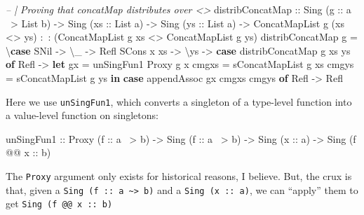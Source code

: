 \documentclass[]{article}
\newenvironment{Shaded}{}{}
\newcommand{\CommentTok}[1]{\textcolor[rgb]{0.38,0.63,0.69}{\textit{#1}}}
\newcommand{\DataTypeTok}[1]{\textcolor[rgb]{0.56,0.13,0.00}{#1}}
\newcommand{\FunctionTok}[1]{\textcolor[rgb]{0.02,0.16,0.49}{#1}}
\newcommand{\KeywordTok}[1]{\textcolor[rgb]{0.00,0.44,0.13}{\textbf{#1}}}
\newcommand{\NormalTok}[1]{#1}
\newcommand{\OtherTok}[1]{\textcolor[rgb]{0.00,0.44,0.13}{#1}}
\begin{document}
\begin{Shaded}
\begin{Highlighting}[]
\CommentTok{-- | Proving that concatMap distributes over <>}
\NormalTok{distribConcatMap}
\OtherTok{    ::} \DataTypeTok{Sing}\NormalTok{ (}\OtherTok{g ::}\NormalTok{ a }\FunctionTok{~>} \DataTypeTok{List}\NormalTok{ b)}
    \OtherTok{->} \DataTypeTok{Sing}\NormalTok{ (}\OtherTok{xs ::} \DataTypeTok{List}\NormalTok{ a)}
    \OtherTok{->} \DataTypeTok{Sing}\NormalTok{ (}\OtherTok{ys ::} \DataTypeTok{List}\NormalTok{ a)}
    \OtherTok{->} \DataTypeTok{ConcatMapList}\NormalTok{ g (xs }\FunctionTok{<>}\NormalTok{ ys) }\FunctionTok{:~:}\NormalTok{ (}\DataTypeTok{ConcatMapList}\NormalTok{ g xs }\FunctionTok{<>} \DataTypeTok{ConcatMapList}\NormalTok{ g ys)}
\NormalTok{distribConcatMap g }\FunctionTok{=}\NormalTok{ \textbackslash{}}\KeywordTok{case}
    \DataTypeTok{SNil} \OtherTok{->}\NormalTok{ \textbackslash{}_ }\OtherTok{->} \DataTypeTok{Refl}
    \DataTypeTok{SCons}\NormalTok{ x xs }\OtherTok{->}\NormalTok{ \textbackslash{}ys }\OtherTok{->}
      \KeywordTok{case}\NormalTok{ distribConcatMap g xs ys }\KeywordTok{of}
        \DataTypeTok{Refl} \OtherTok{->}
          \KeywordTok{let}\NormalTok{ gx    }\FunctionTok{=}\NormalTok{ unSingFun1 }\DataTypeTok{Proxy}\NormalTok{ g x}
\NormalTok{              cmgxs }\FunctionTok{=}\NormalTok{ sConcatMapList g xs}
\NormalTok{              cmgys }\FunctionTok{=}\NormalTok{ sConcatMapList g ys}
          \KeywordTok{in}  \KeywordTok{case}\NormalTok{ appendAssoc gx cmgxs cmgys }\KeywordTok{of}
                \DataTypeTok{Refl} \OtherTok{->} \DataTypeTok{Refl}
\end{Highlighting}
\end{Shaded}

Here we use \texttt{unSingFun1}, which converts a singleton of a type-level
function into a value-level function on singletons:

\begin{Shaded}
\begin{Highlighting}[]
\NormalTok{unSingFun1}
\OtherTok{    ::} \DataTypeTok{Proxy}\NormalTok{ (}\OtherTok{f      ::}\NormalTok{ a }\FunctionTok{~>}\NormalTok{ b)}
    \OtherTok{->} \DataTypeTok{Sing}\NormalTok{  (}\OtherTok{f      ::}\NormalTok{ a }\FunctionTok{~>}\NormalTok{ b)}
    \OtherTok{->} \DataTypeTok{Sing}\NormalTok{  (}\OtherTok{x      ::}\NormalTok{ a)}
    \OtherTok{->} \DataTypeTok{Sing}\NormalTok{  (f }\FunctionTok{@@}\OtherTok{ x ::}\NormalTok{ b)}
\end{Highlighting}
\end{Shaded}

The \texttt{Proxy} argument only exists for historical reasons, I believe. But,
the crux is that, given a
\texttt{Sing\ (f\ ::\ a\ \textasciitilde{}\textgreater{}\ b)} and a
\texttt{Sing\ (x\ ::\ a)}, we can ``apply'' them to get
\texttt{Sing\ (f\ @@\ x\ ::\ b)}
\end{document}
